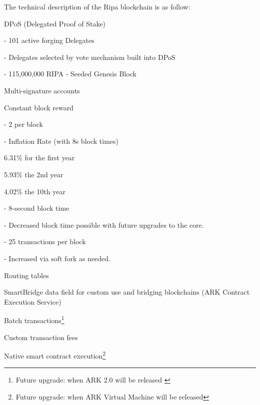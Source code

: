 \documentclass[11pt,fleqn,oneside]{book} %
\begin{document}
The technical description of the Ripa blockchain is as follow:
\begin{enumerate}
	\item DPoS (Delegated Proof of Stake)
	\item Multi-signature accounts
	\item Constant block reward
		\item - 8-second block time
		\item - 25 transactions per block
	\end{description}
	\item Routing tables
	\item SmartBridge data field for custom use and bridging blockchains (ARK Contract Execution Service)
	\item Batch transactions\footnote{Future upgrade: when ARK 2.0 will be released \label{note1}}
	\item Custom transaction fees\footnotemark[\value{footnote}]
	\item Native smart contract execution\footnote{Future upgrade: when ARK Virtual Machine will be released}
\end{enumerate}
\end{document}
